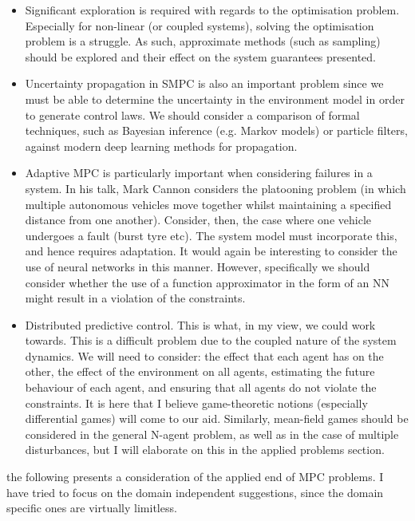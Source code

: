 \documentclass[preprint,11pt]{report}
\begin{document}
\begin{itemize}
	\item Significant exploration is required with regards to the optimisation problem. Especially
	for non-linear (or coupled systems), solving the optimisation problem is a struggle. As such,
	approximate methods (such as sampling) should be explored and their effect on the system
	guarantees presented.
	\item Uncertainty propagation in SMPC is also an important problem since we must be able to
	determine the uncertainty in the environment model in order to generate control laws. We should
	consider a comparison of formal techniques, such as Bayesian inference (e.g. Markov models) or
	particle filters, against modern deep learning methods for propagation.
	\item Adaptive MPC is particularly important when considering failures in a system. In his talk,
	Mark Cannon considers the platooning problem (in which multiple autonomous vehicles move
	together whilst maintaining a specified distance from one another). Consider, then, the case
	where one vehicle undergoes a fault (burst tyre etc). The system model must incorporate this,
	and hence requires adaptation. It would again be interesting to consider the use of neural
	networks in this manner. However, specifically we should consider whether the use of a function
	approximator in the form of an NN might result in a violation of the constraints.
	\item Distributed predictive control. This is what, in my view, we could work towards. This is a
	difficult problem due to the coupled nature of the system dynamics. We will need to consider: the
	effect that each agent has on the other, the effect of the environment on all agents, estimating the
	future behaviour of each agent, and ensuring that all agents do not violate the constraints. It is
	here that I believe game-theoretic notions (especially differential games) will come to our
	aid. Similarly, mean-field games should be considered in the general N-agent problem, as well as
	in the case of multiple disturbances, but I will elaborate on this in the applied problems
	section.
\end{itemize}

the following presents a consideration of the applied end of MPC problems. I have tried to focus on
the domain independent suggestions, since the domain specific ones are virtually limitless.
\end{document}
